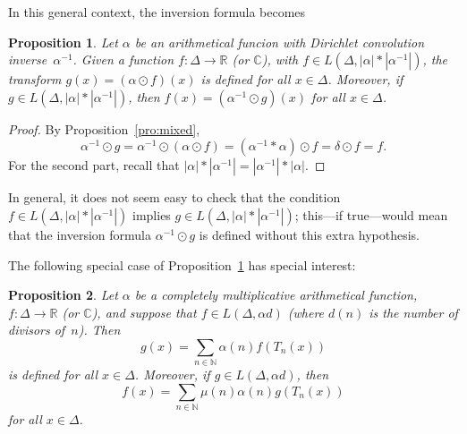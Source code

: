 \documentclass[10pt,a4paper]{amsart}
\theoremstyle{plain}
\newtheorem{proposition}{Proposition}
\theoremstyle{remark}
\newcommand{\N}{\mathbb{N}}
\newcommand{\R}{\mathbb{R}}
\newcommand{\C}{\mathbb{C}}
\newcommand{\numdiv}{d} %
\begin{document}
In this general context, the inversion formula becomes

\begin{proposition}
\label{pro:f<->g-alpha}
Let $\alpha$ be an arithmetical funcion with Dirichlet convolution
inverse~$\alpha^{-1}$. Given a function $f: \Delta \to \R$ (or $\C$),
with $f \in L(\Delta,|\alpha|*|\alpha^{-1}|)$, the transform
$g(x) = (\alpha \odot f)(x)$
is defined for all $x \in \Delta$. Moreover, if 
$g \in L(\Delta,|\alpha|*|\alpha^{-1}|)$, then
$f(x) = (\alpha^{-1} \odot g)(x)$
for all $x \in \Delta$.
\end{proposition}

\begin{proof}
By Proposition~\ref{pro:mixed},
\begin{equation*}
  \alpha^{-1} \odot g = \alpha^{-1} \odot (\alpha \odot f)
  = (\alpha^{-1} * \alpha) \odot f = \delta \odot f = f.
\end{equation*}
For the second part, recall that
$|\alpha|*|\alpha^{-1}| = |\alpha^{-1}|*|\alpha|$.
\end{proof}


In general, it does not seem easy to check that the condition
$f \in L(\Delta,|\alpha|*|\alpha^{-1}|)$ implies
$g \in L(\Delta,|\alpha|*|\alpha^{-1}|)$; this---if true---would mean
that the inversion formula $\alpha^{-1} \odot g$ is defined without
this extra hypothesis.

The following special case of Proposition~\ref{pro:f<->g-alpha} has special interest:

\begin{proposition}
\label{pro:f<->g-acm}
Let $\alpha$ be a completely multiplicative arithmetical function,
$f: \Delta \to \R$ (or $\C$), and suppose that
$f \in L(\Delta,\alpha\numdiv)$ (where $\numdiv(n)$ is the number
of divisors of~$n$).
Then
\begin{equation*}
  g(x) = \sum_{n \in \N} \alpha(n) f(T_n(x))
\end{equation*}
is defined for all $x \in \Delta$. Moreover, if $g \in L(\Delta,\alpha\numdiv)$, then
\begin{equation*}
  f(x) = \sum_{n \in \N} \mu(n) \alpha(n) g(T_n(x))
\end{equation*}
for all $x \in \Delta$.
\end{proposition}
\end{document}
